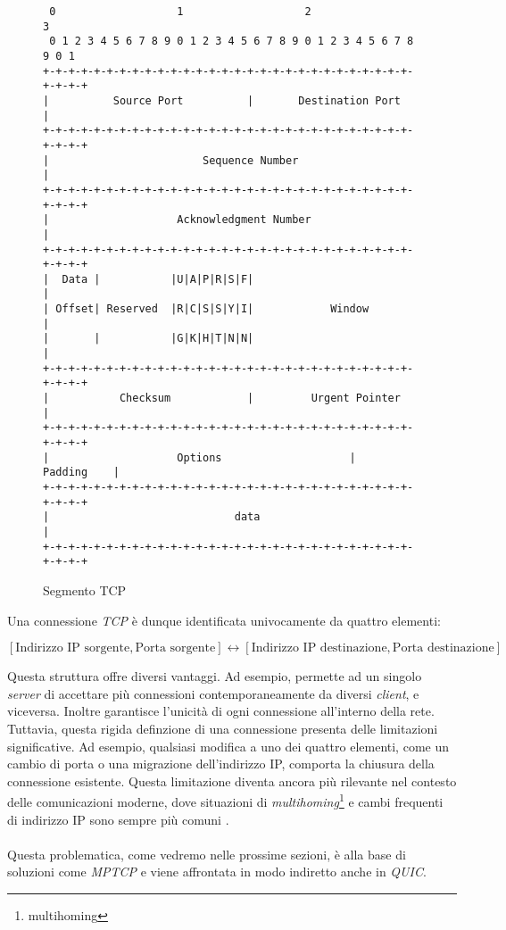 \begin{figure}[!h]
\centering
\begin{BVerbatim}
 0                   1                   2                   3   
 0 1 2 3 4 5 6 7 8 9 0 1 2 3 4 5 6 7 8 9 0 1 2 3 4 5 6 7 8 9 0 1 
+-+-+-+-+-+-+-+-+-+-+-+-+-+-+-+-+-+-+-+-+-+-+-+-+-+-+-+-+-+-+-+-+
|          Source Port          |       Destination Port        |
+-+-+-+-+-+-+-+-+-+-+-+-+-+-+-+-+-+-+-+-+-+-+-+-+-+-+-+-+-+-+-+-+
|                        Sequence Number                        |
+-+-+-+-+-+-+-+-+-+-+-+-+-+-+-+-+-+-+-+-+-+-+-+-+-+-+-+-+-+-+-+-+
|                    Acknowledgment Number                      |
+-+-+-+-+-+-+-+-+-+-+-+-+-+-+-+-+-+-+-+-+-+-+-+-+-+-+-+-+-+-+-+-+
|  Data |           |U|A|P|R|S|F|                               |
| Offset| Reserved  |R|C|S|S|Y|I|            Window             |
|       |           |G|K|H|T|N|N|                               |
+-+-+-+-+-+-+-+-+-+-+-+-+-+-+-+-+-+-+-+-+-+-+-+-+-+-+-+-+-+-+-+-+
|           Checksum            |         Urgent Pointer        |
+-+-+-+-+-+-+-+-+-+-+-+-+-+-+-+-+-+-+-+-+-+-+-+-+-+-+-+-+-+-+-+-+
|                    Options                    |    Padding    |
+-+-+-+-+-+-+-+-+-+-+-+-+-+-+-+-+-+-+-+-+-+-+-+-+-+-+-+-+-+-+-+-+
|                             data                              |
+-+-+-+-+-+-+-+-+-+-+-+-+-+-+-+-+-+-+-+-+-+-+-+-+-+-+-+-+-+-+-+-+
           \end{BVerbatim}
\caption{Segmento TCP}
\label{fig}
\end{figure}

\noindent Una connessione \emph{TCP} è dunque identificata univocamente da quattro elementi:

\begin{center}
    \small
    $[\text{Indirizzo IP sorgente}, \text{Porta sorgente}] \leftrightarrow [\text{Indirizzo IP destinazione}, \text{Porta destinazione}]$
\end{center}

\noindent Questa struttura offre diversi vantaggi. Ad esempio, permette ad un singolo \emph{server} di accettare più connessioni contemporaneamente da diversi \emph{client}, e viceversa. 
Inoltre garantisce l'unicità di ogni connessione all'interno della rete.
\\
Tuttavia, questa rigida definzione di una connessione presenta delle limitazioni significative. Ad esempio, qualsiasi modifica a uno dei quattro elementi, come un cambio di porta o una migrazione dell'indirizzo IP, comporta la chiusura della connessione esistente.
Questa limitazione diventa ancora più rilevante nel contesto delle comunicazioni moderne, dove situazioni di \emph{multihoming}\footnote{\gls{multihoming}} e cambi frequenti di indirizzo IP sono sempre più comuni \cite{site:tcp}. 
\\
\\
Questa problematica, come vedremo nelle prossime sezioni, è alla base di soluzioni come \emph{MPTCP} e viene affrontata in modo indiretto anche in \emph{QUIC}.

